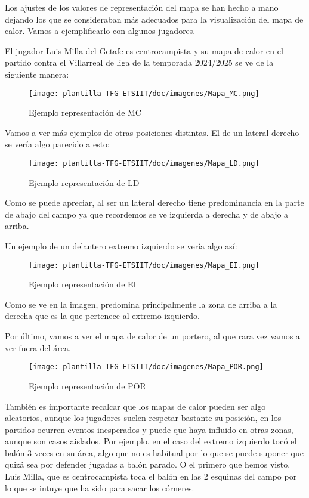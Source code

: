 Los ajustes de los valores de representación del mapa se han hecho a mano dejando los que se consideraban más adecuados para la visualización del mapa de calor. Vamos a ejemplificarlo con algunos jugadores.

El jugador Luis Milla del Getafe es centrocampista y su mapa de calor en el partido contra el Villarreal de liga de la temporada 2024/2025 se ve de la siguiente manera:

\begin{figure}[H]
    \centering
    \texttt{[image: plantilla-TFG-ETSIIT/doc/imagenes/Mapa\_MC.png]}
    \caption{Ejemplo representación de MC}
    \label{fig:etiqueta-imagen}
\end{figure}

Vamos a ver más ejemplos de otras posiciones distintas. El de un lateral derecho se vería algo parecido a esto:

\begin{figure}[H]
    \centering
    \texttt{[image: plantilla-TFG-ETSIIT/doc/imagenes/Mapa\_LD.png]}
    \caption{Ejemplo representación de LD}
    \label{fig:etiqueta-imagen}
\end{figure}

Como se puede apreciar, al ser un lateral derecho tiene predominancia en la parte de abajo del campo ya que recordemos se ve izquierda a derecha y de abajo a arriba.

Un ejemplo de un delantero extremo izquierdo se vería algo así:

\begin{figure}[H]
    \centering
    \texttt{[image: plantilla-TFG-ETSIIT/doc/imagenes/Mapa\_EI.png]}
    \caption{Ejemplo representación de EI}
    \label{fig:etiqueta-imagen}
\end{figure}

Como se ve en la imagen, predomina principalmente la zona de arriba a la derecha que es la que pertenece al extremo izquierdo.

Por último, vamos a ver el mapa de calor de un portero, al que rara vez vamos a ver fuera del área.

\begin{figure}[H]
    \centering
    \texttt{[image: plantilla-TFG-ETSIIT/doc/imagenes/Mapa\_POR.png]}
    \caption{Ejemplo representación de POR}
    \label{fig:etiqueta-imagen}
\end{figure}

También es importante recalcar que los mapas de calor pueden ser algo aleatorios, aunque los jugadores suelen respetar bastante su posición, en los partidos ocurren eventos inesperados y puede que haya influido en otras zonas, aunque son casos aislados. Por ejemplo, en el caso del extremo izquierdo tocó el balón 3 veces en su área, algo que no es habitual por lo que se puede suponer que quizá sea por defender jugadas a balón parado. O el primero que hemos visto, Luis Milla, que es centrocampista toca el balón en las 2 esquinas del campo por lo que se intuye que ha sido para sacar los córneres.

